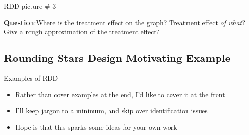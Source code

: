 \documentclass{beamer}
\begin{document}
\begin{frame}{RDD picture \# 3}
	
	\begin{figure}
	\end{figure}

\textbf{Question}:Where is the treatment effect on the graph? Treatment effect \emph{of what}? Give a rough approximation of the treatment effect?
	
	
\end{frame}




\subsection{Rounding Stars Design Motivating Example}


\begin{frame}{Examples of RDD}

\begin{itemize}
\item Rather than cover examples at the end, I'd like to cover it at the front
\item I'll keep jargon to a minimum, and skip over identification issues
\item Hope is that this sparks some ideas for your own work
\end{itemize}

\end{frame}
\end{document}
